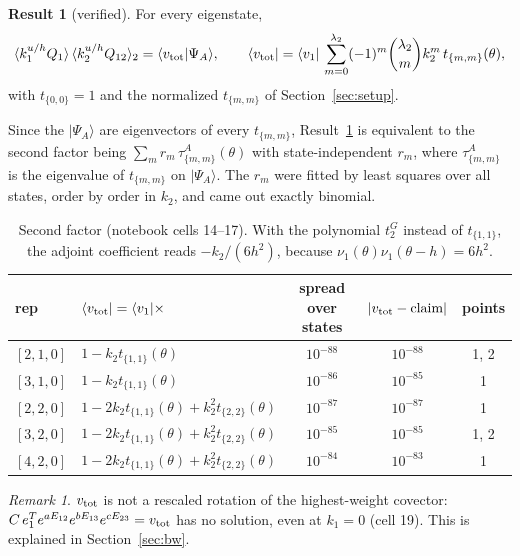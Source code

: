 \documentclass[11pt]{article}
\theoremstyle{definition}
\newtheorem{result}{Result}
\theoremstyle{remark}
\newtheorem*{remark}{Remark}
\begin{document}
\begin{result}[verified]\label{res:vtot}
For every eigenstate,
\begin{equation}
\langle k_1^{u/h}Q_1\rangle\,\langle k_2^{u/h}Q_{12}\rangle_2=\langle v_{\rm tot}|\Psi_A\rangle,\qquad
\langle v_{\rm tot}|=\langle v_1|\,\sum_{m=0}^{\lambda_2}(-1)^m\binom{\lambda_2}{m}k_2^m\,t_{\{m,m\}}(\theta),
\end{equation}
with $t_{\{0,0\}}=1$ and the normalized $t_{\{m,m\}}$ of Section~\ref{sec:setup}.
\end{result}

Since the $|\Psi_A\rangle$ are eigenvectors of every $t_{\{m,m\}}$, Result~\ref{res:vtot} is equivalent to the second factor being $\sum_m r_m\,\tau^{A}_{\{m,m\}}(\theta)$ with state-independent $r_m$, where $\tau^A_{\{m,m\}}$ is the eigenvalue of $t_{\{m,m\}}$ on $|\Psi_A\rangle$. The $r_m$ were fitted by least squares over all states, order by order in $k_2$, and came out exactly binomial.

\begin{table}[h]\centering
\begin{tabular}{llccc}\toprule
rep & $\langle v_{\rm tot}|=\langle v_1|\times$ & spread over states & $|v_{\rm tot}-\text{claim}|$ & points\\\midrule
$[2,1,0]$ & $1-k_2t_{\{1,1\}}(\theta)$ & $10^{-88}$ & $10^{-88}$ & 1, 2\\
$[3,1,0]$ & $1-k_2t_{\{1,1\}}(\theta)$ & $10^{-86}$ & $10^{-85}$ & 1\\
$[2,2,0]$ & $1-2k_2t_{\{1,1\}}(\theta)+k_2^2t_{\{2,2\}}(\theta)$ & $10^{-87}$ & $10^{-87}$ & 1\\
$[3,2,0]$ & $1-2k_2t_{\{1,1\}}(\theta)+k_2^2t_{\{2,2\}}(\theta)$ & $10^{-85}$ & $10^{-85}$ & 1, 2\\
$[4,2,0]$ & $1-2k_2t_{\{1,1\}}(\theta)+k_2^2t_{\{2,2\}}(\theta)$ & $10^{-84}$ & $10^{-83}$ & 1\\\bottomrule
\end{tabular}
\caption{Second factor (notebook cells 14--17). With the polynomial $t^G_2$ instead of $t_{\{1,1\}}$, the adjoint coefficient reads $-k_2/(6h^2)$, because $\nu_1(\theta)\nu_1(\theta-h)=6h^2$.}
\end{table}

\begin{remark}
$v_{\rm tot}$ is not a rescaled rotation of the highest-weight covector: $C\,e_1^Te^{aE_{12}}e^{bE_{13}}e^{cE_{23}}=v_{\rm tot}$ has no solution, even at $k_1=0$ (cell 19). This is explained in Section~\ref{sec:bw}.
\end{remark}
\end{document}
